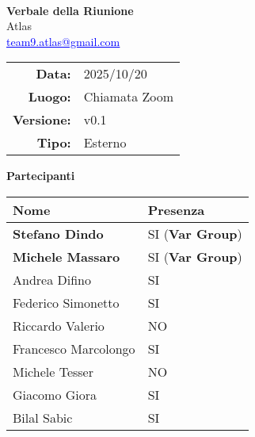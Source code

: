 \documentclass[a4paper,12pt]{article}
\makeatletter
\newcommand{\Gruppo}{Atlas}
\newcommand{\Email}{\href{mailto:team9.atlas@gmail.com}{\textcolor{blue}{\underline{team9.atlas@gmail.com}}}}
\newcommand{\TitoloVerbale}{Verbale della Riunione}
\newcommand{\DataVerbale}{2025/10/20}
\newcommand{\LuogoVerbale}{Chiamata Zoom}
\newcommand{\LogoGruppo}{img/AtlasLogo.png} %
\newcommand{\VersioneVerbale}{v0.1} %
\newcommand{\VerbaleEsterno}{Esterno}
\makeatother
\begin{document}
\begin{titlepage}
    \centering

    \vspace*{0cm}
    \\
    [.5cm]
    {\Huge \textbf{\TitoloVerbale}}\\[0.8cm]
    {\LARGE \Gruppo}\\[0.1cm]
    {\Email}\\[1.2cm]

    \begin{tabular}{rl}
        \textbf{Data:} & \DataVerbale \\
        \textbf{Luogo:} & \LuogoVerbale \\
        \textbf{Versione:} & \VersioneVerbale \\
        \textbf{Tipo:} & \VerbaleEsterno \\
    \end{tabular}

    \vspace{1.2cm}

    {\large \textbf{Partecipanti}}\\[0.5cm]
    \begin{tabular}{l|l}
        \textbf{Nome} & \textbf{Presenza} \\
        \hline
        \textbf{Stefano Dindo} & SI (\textbf{Var Group})\\
        \textbf{Michele Massaro} & SI (\textbf{Var Group})\\
        Andrea Difino & SI \\
        Federico Simonetto & SI \\
        Riccardo Valerio & NO \\
        Francesco Marcolongo & SI \\
        Michele Tesser & NO \\
        Giacomo Giora & SI \\
        Bilal Sabic & SI \\
    \end{tabular}

\end{titlepage}
\end{document}
